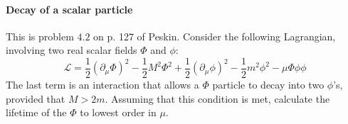 \documentclass[hyperref, a4paper]{article}
\begin{document}
\paragraph{}

\paragraph{Decay of a scalar particle} This is problem $4.2$ on p. 127 of Peskin. 
Consider the following Lagrangian, involving two real scalar fields $\Phi$ and $\phi$:
\[
\mathcal{L}=\frac{1}{2}\left(\partial_{\mu} \Phi\right)^{2}-\frac{1}{2} M^{2} \Phi^{2}+\frac{1}{2}\left(\partial_{\mu} \phi\right)^{2}-\frac{1}{2} m^{2} \phi^{2}-\mu \Phi \phi \phi
\]
The last term is an interaction that allows a $\Phi$ particle to decay into two $\phi$'s, provided that $M>2 m$.
Assuming that this condition is met, calculate the lifetime of the $\Phi$ to lowest order in $\mu$.
\end{document}
